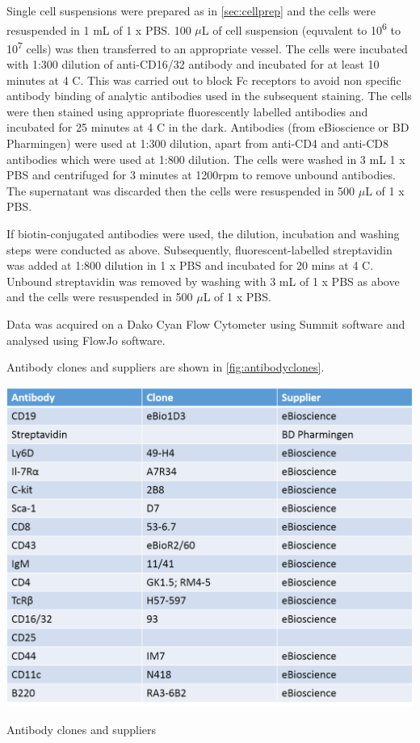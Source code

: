 Single cell suspensions were prepared as in \cref{sec:cellprep} and the cells were resuspended in 1 mL of 1 x PBS.
100 $\mu$L of cell suspension (equvalent to 10\textsuperscript{6} to 10\textsuperscript{7} cells) was then transferred to an appropriate vessel.
The cells were incubated with 1:300 dilution of anti-CD16/32 antibody and incubated for at least 10 minutes at 4 \textdegree C.
This was carried out to block Fc receptors to avoid non specific antibody binding of analytic antibodies used in the subsequent staining.
The cells were then stained using appropriate fluorescently labelled antibodies and incubated for 25 minutes at 4 \textdegree C in the dark.
Antibodies (from eBioscience or BD Pharmingen) were used at 1:300 dilution, apart from anti-CD4 and anti-CD8 antibodies which were used at 1:800 dilution. 
The cells were washed in 3 mL 1 x PBS and centrifuged for 3 minutes at 1200rpm to remove unbound antibodies.
The supernatant was discarded then the cells were resuspended in 500 $\mu$L of 1 x PBS.

If biotin-conjugated antibodies were used, the dilution, incubation and washing steps were conducted as above.
Subsequently, fluorescent-labelled streptavidin was added at 1:800 dilution in 1 x PBS and incubated for 20 mins at 4 \textdegree C.
Unbound streptavidin was removed by washing with 3 mL of 1 x PBS as above and the cells were resuspended in 500 $\mu$L of 1 x PBS.

Data was acquired on a Dako Cyan Flow Cytometer using Summit software and analysed using FlowJo software.

Antibody clones and suppliers are shown in \cref{fig:antibodyclones}. 

\begin{table}
\includegraphics[width=\textwidth]{Figures/Antibodyclones.png}
\caption{Antibody clones and suppliers}
\label{fig:antibodyclones}
\end{table}

